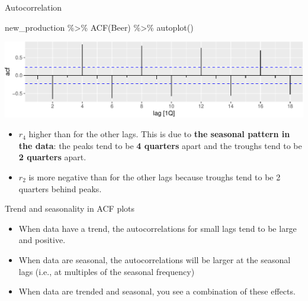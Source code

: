 \documentclass[14pt,ignorenonframetext,aspectratio=169]{beamer}
\newenvironment{Shaded}{\begin{snugshade}}{\end{snugshade}}
\newcommand{\FunctionTok}[1]{\textcolor[rgb]{0.00,0.00,0.00}{#1}}
\newcommand{\NormalTok}[1]{#1}
\newcommand{\SpecialCharTok}[1]{\textcolor[rgb]{0.00,0.00,0.00}{#1}}
\providecommand{\tightlist}{%
  \setlength{\itemsep}{0pt}\setlength{\parskip}{0pt}}
\renewenvironment{Shaded}{\color{black}\begin{snugshade}\color{black}}{\end{snugshade}}
\renewenvironment{Shaded}{\color{black}\fontsize{10}{10}\sf\begin{snugshade}\color{black}}{\end{snugshade}}
\begin{document}
\begin{frame}[fragile]{Autocorrelation}
\protect\hypertarget{autocorrelation-4}{}
\fontsize{11}{13}\sf

\begin{Shaded}
\begin{Highlighting}[]
\NormalTok{new\_production }\SpecialCharTok{\%\textgreater{}\%} \FunctionTok{ACF}\NormalTok{(Beer) }\SpecialCharTok{\%\textgreater{}\%} \FunctionTok{autoplot}\NormalTok{()}
\end{Highlighting}
\end{Shaded}

\includegraphics{2-tsgraphics_files/figure-beamer/beeracf2-1.pdf}

\begin{itemize}
\tightlist
\item
  \(r_{4}\) higher than for the other lags. This is due to \textbf{the
  seasonal pattern in the data}: the peaks tend to be \textbf{4
  quarters} apart and the troughs tend to be \textbf{2 quarters} apart.
\item
  \(r_2\) is more negative than for the other lags because troughs tend
  to be 2 quarters behind peaks.
\end{itemize}
\end{frame}

\begin{frame}{Trend and seasonality in ACF plots}
\protect\hypertarget{trend-and-seasonality-in-acf-plots}{}
\begin{itemize}
\tightlist
\item
  When data have a trend, the autocorrelations for small lags tend to be
  large and positive.
\item
  When data are seasonal, the autocorrelations will be larger at the
  seasonal lags (i.e., at multiples of the seasonal frequency)
\item
  When data are trended and seasonal, you see a combination of these
  effects.
\end{itemize}
\end{frame}
\end{document}
